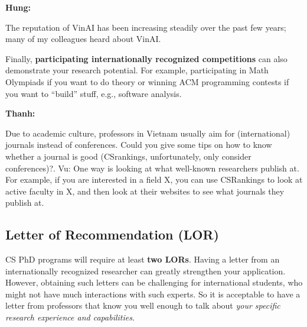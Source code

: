 \documentclass[11pt]{article}
\newenvironment{commentbox}[1][]{
\small
    \begin{cbox}
    \textbf{#1} 
 }{
   \end{cbox}
}
\begin{document}
\begin{commentbox}[Hung:]
The reputation of VinAI has been increasing steadily over the past few years; many of my colleagues heard about VinAI.
\end{commentbox}

Finally, \textbf{participating internationally recognized competitions} can also demonstrate your research potential.
For example, participating in Math Olympiads if you want to do theory or  winning ACM programming contests if you want to ``build'' stuff, e.g., software analysis.

\begin{commentbox}[Thanh:]
Due to academic culture, professors in Vietnam usually aim for (international) journals instead of conferences. Could you give some tips on how to know whether a journal is good (CSrankings, unfortunately, only consider conferences)?.
\tcblower
Vu: One way is looking at what well-known researchers publish at. For example, if you are interested in a field X, you can use CSRankings to look at active faculty in X, and then look at their websites to see what journals they publish at.
\end{commentbox}

\subsection{Letter of Recommendation (LOR)}\label{sec:lor}




CS PhD programs will require at least \textbf{two LORs}. Having a letter from an internationally recognized researcher can greatly strengthen your application. However, obtaining such letters
can be challenging for international students, who might not have much interactions with such experts. So it is acceptable to have a letter from professors that know you well enough to talk about \emph{your specific research experience and capabilities}.
\end{document}
